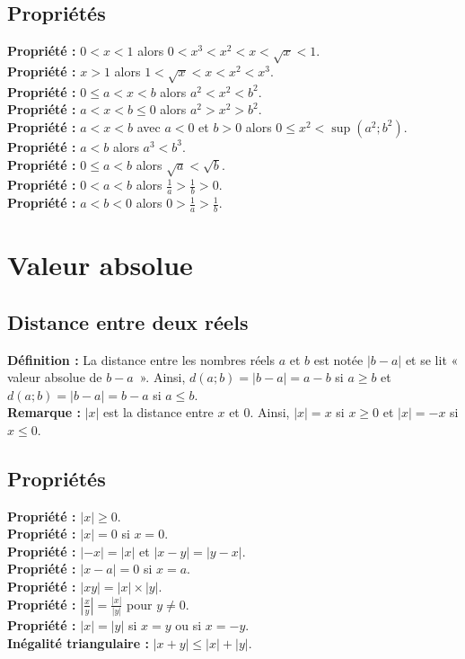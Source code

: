 \documentclass[a4paper,titlepage]{article}
\let\oldsection\section
\renewcommand\section{\clearpage\oldsection}
\begin{document}
    \subsection{Propriétés}
        \textbf{Propriété :} $0<x<1$ alors $0<x^{3}<x^{2}<x<\sqrt{x}<1$.
        \\
        \textbf{Propriété :} $x>1$ alors $1<\sqrt{x}<x<x^{2}<x^{3}$.
        \\
        \textbf{Propriété :} $0\leqslant a<x<b$ alors $a^{2}<x^{2}<b^{2}$.
        \\
        \textbf{Propriété :} $a<x<b\leqslant 0$ alors $a^{2}>x^{2}>b^{2}$.
        \\
        \textbf{Propriété :} $a<x<b$ avec $a<0$ et $b>0$ alors $0\leq x^{2}<\sup\left(a^{2};b^{2}\right)$.
        \\
        \textbf{Propriété :} $a<b$ alors $a^{3}<b^{3}$.
        \\
        \textbf{Propriété :} $0\leqslant a<b$ alors $\sqrt{a}<\sqrt{b}$.
        \\
        \textbf{Propriété :} $0<a<b$ alors $\frac{1}{a}>\frac{1}{b}>0$.
        \\
        \textbf{Propriété :} $a<b<0$ alors $0>\frac{1}{a}>\frac{1}{b}$.
\section{Valeur absolue}
    \subsection{Distance entre deux réels}
        \textbf{Définition :} La distance entre les nombres réels $a$ et $b$ est notée $\left|b-a\right|$ et se lit « valeur absolue de $b-a$~». Ainsi, $d(a;b)=\left|b-a\right|=a-b$ si $a\geqslant b$ et $d(a;b)=\left|b-a\right|=b-a$ si $a\leqslant b$.
        \\
        \textbf{Remarque :} $\left|x\right|$ est la distance entre $x$ et $0$. Ainsi, $\left|x\right|=x$ si $x\geqslant 0$ et $\left|x\right|=-x$ si $x\leqslant 0$.
    \subsection{Propriétés}
        \textbf{Propriété :} $\left|x\right|\geqslant 0$.
        \\
        \textbf{Propriété :} $\left|x\right|=0$ si $x=0$.
        \\
        \textbf{Propriété :} $\left|-x\right|=\left|x\right|$ et $\left|x-y\right|=\left|y-x\right|$.
        \\
        \textbf{Propriété :} $\left|x-a\right|=0$ si $x=a$.
        \\
        \textbf{Propriété :} $\left|xy\right|=\left|x\right|\times\left|y\right|$.
        \\
        \textbf{Propriété :} $\left|\frac{x}{y}\right|=\frac{\left|x\right|}{\left|y\right|}$ pour $y\neq 0$.
        \\
        \textbf{Propriété :} $\left|x\right|=\left|y\right|$ si $x=y$ ou si $x=-y$.
        \\
        \textbf{Inégalité triangulaire :} $\left|x+y\right|\leqslant \left|x\right|+\left|y\right|$.
\end{document}
